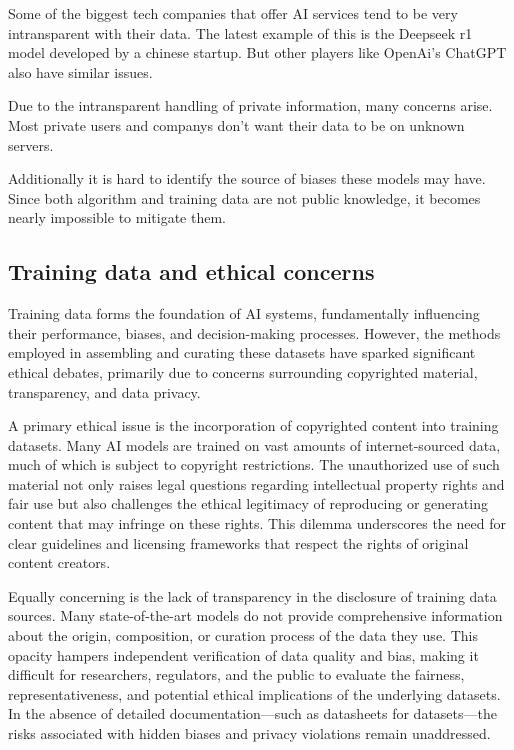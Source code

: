 Some of the biggest tech companies that offer AI services tend to be very intransparent with their data. 
The latest example of this is the Deepseek r1 model developed by a chinese startup. But other players like OpenAi's ChatGPT also have similar issues.

Due to the intransparent handling of private information, many concerns arise. Most private users and companys don't want their data to be on unknown servers.

Additionally it is hard to identify the source of biases these models may have. Since both algorithm and training data are not public knowledge, it becomes nearly impossible to mitigate them.

\cite{AiTransparancy}

\subsection{Training data and ethical concerns}
\label{subsec:training-data-and-ethical-concerns}

Training data forms the foundation of AI systems, fundamentally influencing their performance, biases, and decision-making processes. However, the methods employed in assembling and curating these datasets have sparked significant ethical debates, primarily due to concerns surrounding copyrighted material, transparency, and data privacy.

A primary ethical issue is the incorporation of copyrighted content into training datasets. Many AI models are trained on vast amounts of internet-sourced data, much of which is subject to copyright restrictions. The unauthorized use of such material not only raises legal questions regarding intellectual property rights and fair use but also challenges the ethical legitimacy of reproducing or generating content that may infringe on these rights. This dilemma underscores the need for clear guidelines and licensing frameworks that respect the rights of original content creators.

Equally concerning is the lack of transparency in the disclosure of training data sources. Many state-of-the-art models do not provide comprehensive information about the origin, composition, or curation process of the data they use. This opacity hampers independent verification of data quality and bias, making it difficult for researchers, regulators, and the public to evaluate the fairness, representativeness, and potential ethical implications of the underlying datasets. In the absence of detailed documentation—such as datasheets for datasets—the risks associated with hidden biases and privacy violations remain unaddressed.

